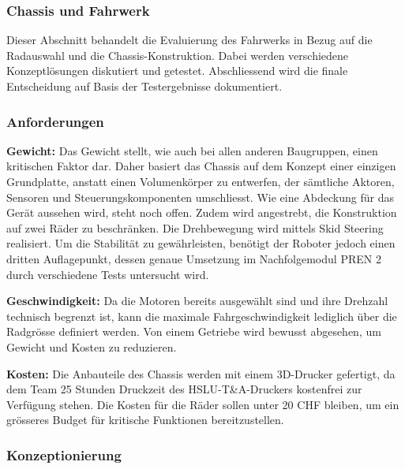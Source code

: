 \documentclass[main.tex]{subfiles} %
\begin{document}

\subsubsection{Chassis und Fahrwerk}

Dieser Abschnitt behandelt die Evaluierung des Fahrwerks in Bezug auf die
Radauswahl und die Chassis-Konstruktion. Dabei werden verschiedene
Konzeptlösungen diskutiert und getestet. Abschliessend wird die finale
Entscheidung auf Basis der Testergebnisse dokumentiert.

\subsubsection*{Anforderungen}

\textbf{Gewicht:} \newline
Das Gewicht stellt, wie auch bei allen anderen Baugruppen, einen kritischen Faktor dar.
Daher basiert das Chassis auf dem Konzept einer einzigen Grundplatte, anstatt einen
Volumenkörper zu entwerfen, der sämtliche Aktoren, Sensoren und Steuerungskomponenten
umschliesst. Wie eine Abdeckung für das Gerät aussehen wird, steht noch offen. 
Zudem wird angestrebt, die Konstruktion auf zwei Räder zu beschränken.
Die Drehbewegung wird mittels Skid Steering realisiert. Um die Stabilität zu
gewährleisten, benötigt der Roboter jedoch einen dritten Auflagepunkt, dessen genaue
Umsetzung im Nachfolgemodul PREN 2 durch verschiedene Tests untersucht wird.

\textbf{Geschwindigkeit:} \newline
Da die Motoren bereits ausgewählt sind und ihre Drehzahl technisch begrenzt ist,
kann die maximale Fahrgeschwindigkeit lediglich über die Radgrösse definiert werden.
Von einem Getriebe wird bewusst abgesehen, um Gewicht und Kosten zu reduzieren.

\textbf{Kosten:} \newline
Die Anbauteile des Chassis werden mit einem 3D-Drucker gefertigt, da dem Team
25 Stunden Druckzeit des HSLU-T\&A-Druckers kostenfrei zur Verfügung stehen.
Die Kosten für die Räder sollen unter 20 CHF bleiben, um ein grösseres Budget
für kritische Funktionen bereitzustellen.

\subsubsection*{Konzeptionierung}
\end{document}
